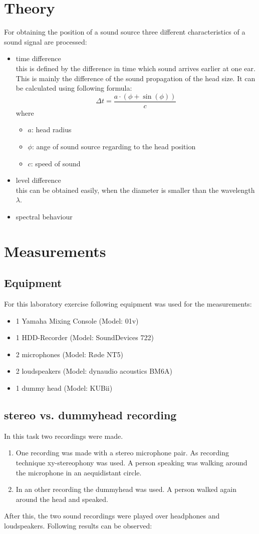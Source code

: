 \documentclass{article}
\begin{document}
\section{Theory}
For obtaining the position of a sound source three different characteristics of a sound signal are processed:
\begin{itemize}
\item time difference\\
this is defined by the difference in time which sound arrives earlier at one ear. This is mainly the difference of the sound propagation of the head size. It can be calculated using following formula:
\begin{equation}
\Delta t=\frac{a\cdot(\phi+\sin(\phi))}{c}
\end{equation}
where
\begin{itemize}
\item $a$: head radius
\item $\phi$: ange of sound source regarding to the head position
\item $c$: speed of sound
\end{itemize}
\item level difference\\
this can be obtained easily, when the diameter is smaller than the wavelength $\lambda$. 
\item spectral behaviour
\end{itemize}

\section{Measurements}
\subsection{Equipment}
For this laboratory exercise following equipment was used for the measurements:
\begin{itemize}
\item 1 Yamaha Mixing Console (Model: 01v)
\item 1 HDD-Recorder (Model: SoundDevices 722)
\item 2 microphones (Model: Røde NT5)
\item 2 loudspeakers (Model: dynaudio acoustics BM6A)
\item 1 dummy head (Model: KUBii)
\end{itemize}
\subsection{stereo vs. dummyhead recording}
In this task two recordings were made. 
\begin{enumerate}
\item One recording was made with a stereo microphone pair. As recording technique xy-stereophony was used. A person speaking was walking around the microphone in an aequidistant circle.
\item In an other recording the dummyhead was used. A person walked again around the head and speaked.
\end{enumerate}
After this, the two sound recordings were played over headphones and loudspeakers. Following results can be observed:
\end{document}
